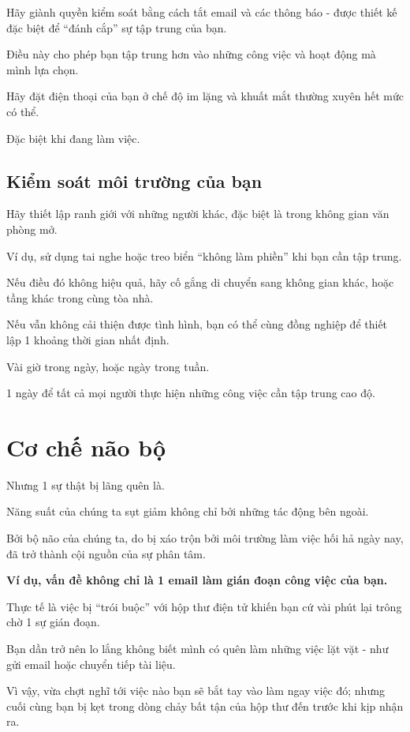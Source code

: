 \documentclass{book}
\numberwithin{equation}{section}
\begin{document}
Hãy giành quyền kiểm soát bằng cách tắt email và các thông báo - được thiết kế đặc biệt để ``đánh cắp'' sự tập trung của bạn.

Điều này cho phép bạn tập trung hơn vào những công việc và hoạt động mà mình lựa chọn.

Hãy đặt điện thoại của bạn ở chế độ im lặng và khuất mắt thường xuyên hết mức có thể.

Đặc biệt khi đang làm việc.

\subsection{Kiểm soát môi trường của bạn}
Hãy thiết lập ranh giới với những người khác, đặc biệt là trong không gian văn phòng mở.

Ví dụ, sử dụng tai nghe hoặc treo biển ``không làm phiền'' khi bạn cần tập trung.

Nếu điều đó không hiệu quả, hãy cố gắng di chuyển sang không gian khác, hoặc tầng khác trong cùng tòa nhà.

Nếu vẫn không cải thiện được tình hình, bạn có thể cùng đồng nghiệp để thiết lập 1 khoảng thời gian nhất định.

Vài giờ trong ngày, hoặc ngày trong tuần.

1 ngày để tất cả mọi người thực hiện những công việc cần tập trung cao độ.

\section{Cơ chế não bộ}
Nhưng 1 sự thật bị lãng quên là.

Năng suất của chúng ta sụt giảm không chỉ bởi những tác động bên ngoài.

Bởi bộ não của chúng ta, do bị xáo trộn bởi môi trường làm việc hối hả ngày nay, đã trở thành cội nguồn của sự phân tâm.

\textbf{Ví dụ, vấn đề không chỉ là 1 email làm gián đoạn công việc của bạn.}

Thực tế là việc bị ``trói buộc'' với hộp thư điện tử khiến bạn cứ vài phút lại trông chờ 1 sự gián đoạn.

Bạn dần trở nên lo lắng không biết mình có quên làm những việc lặt vặt - như gửi email hoặc chuyển tiếp tài liệu.

Vì vậy, vừa chợt nghĩ tới việc nào bạn sẽ bắt tay vào làm ngay việc đó; nhưng cuối cùng bạn bị kẹt trong dòng chảy bất tận của hộp thư đến trước khi kịp nhận ra.
\end{document}
